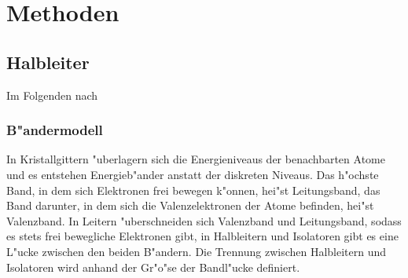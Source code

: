 \section{Methoden}
\subsection{Halbleiter}
Im Folgenden nach \cite{astr}
\subsubsection{B"andermodell}
In Kristallgittern "uberlagern sich die Energieniveaus der benachbarten Atome und es entstehen Energieb"ander anstatt der diskreten Niveaus. Das h"ochste Band, in dem sich Elektronen frei bewegen k"onnen, hei"st Leitungsband, das Band darunter, in dem sich die Valenzelektronen der Atome befinden, hei"st Valenzband. In Leitern "uberschneiden sich Valenzband und Leitungsband, sodass es stets frei bewegliche Elektronen gibt, in Halbleitern und Isolatoren gibt es eine L"ucke zwischen den beiden B"andern. Die Trennung zwischen Halbleitern und Isolatoren wird anhand der Gr"o"se der Bandl"ucke definiert. 
